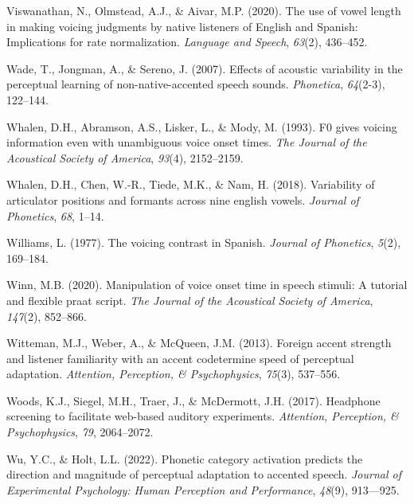 \documentclass[
  12pt,
  twoside]{article}
\newlength{\cslhangindent}
\newlength{\cslentryspacingunit} %
\newenvironment{CSLReferences}[2] %
 {%
  \setlength{\parindent}{0pt}
  \ifodd #1
  \let\oldpar\par
  \def\par{\hangindent=\cslhangindent\oldpar}
  \fi
  \setlength{\parskip}{#2\cslentryspacingunit}
 }%
 {}
\begin{document}
\begin{CSLReferences}{1}{0}
\leavevmode{}%
Viswanathan, N., Olmstead, A.J., \& Aivar, M.P. (2020). The use of vowel length in making voicing judgments by native listeners of {English and Spanish}: Implications for rate normalization. \emph{Language and Speech}, \emph{63}(2), 436--452.

\leavevmode{}%
Wade, T., Jongman, A., \& Sereno, J. (2007). Effects of acoustic variability in the perceptual learning of non-native-accented speech sounds. \emph{Phonetica}, \emph{64}(2-3), 122--144.

\leavevmode{}%
Whalen, D.H., Abramson, A.S., Lisker, L., \& Mody, M. (1993). F0 gives voicing information even with unambiguous voice onset times. \emph{The Journal of the Acoustical Society of America}, \emph{93}(4), 2152--2159.

\leavevmode{}%
Whalen, D.H., Chen, W.-R., Tiede, M.K., \& Nam, H. (2018). Variability of articulator positions and formants across nine english vowels. \emph{Journal of Phonetics}, \emph{68}, 1--14.

\leavevmode{}%
Williams, L. (1977). The voicing contrast in {Spanish}. \emph{Journal of Phonetics}, \emph{5}(2), 169--184.

\leavevmode{}%
Winn, M.B. (2020). Manipulation of voice onset time in speech stimuli: A tutorial and flexible praat script. \emph{The Journal of the Acoustical Society of America}, \emph{147}(2), 852--866.

\leavevmode{}%
Witteman, M.J., Weber, A., \& McQueen, J.M. (2013). Foreign accent strength and listener familiarity with an accent codetermine speed of perceptual adaptation. \emph{Attention, Perception, \& Psychophysics}, \emph{75}(3), 537--556.

\leavevmode{}%
Woods, K.J., Siegel, M.H., Traer, J., \& McDermott, J.H. (2017). Headphone screening to facilitate web-based auditory experiments. \emph{Attention, Perception, \& Psychophysics}, \emph{79}, 2064--2072.

\leavevmode{}%
Wu, Y.C., \& Holt, L.L. (2022). Phonetic category activation predicts the direction and magnitude of perceptual adaptation to accented speech. \emph{Journal of Experimental Psychology: Human Perception and Performance}, \emph{48}(9), 913---925.


\end{CSLReferences}
\end{document}

